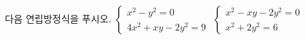 다음 연립방정식을 푸시오.
 $\begin{cases} x^2-y^2=0 \\ 4x^2+xy-2y^2=9 \end{cases}$
 $\begin{cases} x^2-xy-2y^2=0 \\ x^2+2y^2=6 \end{cases}$
